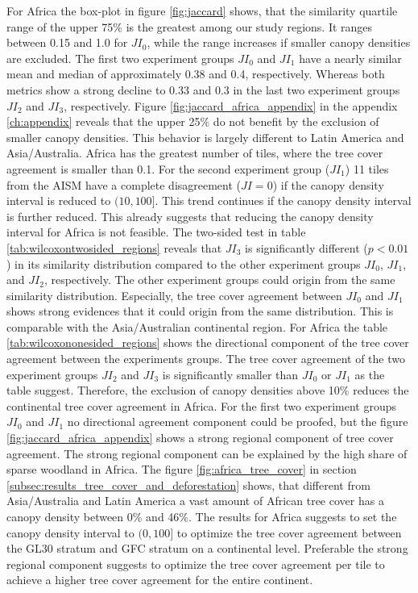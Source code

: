 			For Africa the box-plot in figure \ref{fig:jaccard} shows, that the similarity quartile range of the upper 75\% is the greatest among our study regions. It ranges between 0.15 and 1.0 for $JI_0$, while the range increases if smaller canopy densities are excluded. The first two experiment groups $JI_0$ and $JI_1$ have a nearly similar mean and median of approximately 0.38 and 0.4, respectively. Whereas both metrics show a strong decline to 0.33 and 0.3 in the last two experiment groups $JI_2$ and $JI_3$, respectively. Figure \ref{fig:jaccard_africa_appendix} in the appendix \ref{ch:appendix} reveals that the upper 25\% do not benefit by the exclusion of smaller canopy densities. This behavior is largely different to Latin America and Asia/Australia. Africa has the greatest number of tiles, where the tree cover agreement is smaller than 0.1. For the second experiment group ($JI_1$) 11 tiles from the \ac{AISM} have a complete disagreement ($JI=0$) if the canopy density interval is reduced to $(10,100]$. This trend continues if the canopy density interval is further reduced. This already suggests that reducing the canopy density interval for Africa is not feasible. The two-sided test in table \ref{tab:wilcoxontwosided_regions} reveals that $JI_3$ is significantly different ($p<0.01$) in its similarity distribution compared to the other experiment groups $JI_0$, $JI_1$, and $JI_2$, respectively. The other experiment groups could origin from the same similarity distribution. Especially, the tree cover agreement between $JI_0$ and $JI_1$ shows strong evidences that it could origin from the same distribution. This is comparable with the Asia/Australian continental region. For Africa the table \ref{tab:wilcoxononesided_regions} shows the directional component of the tree cover agreement between the experiments groups. The tree cover agreement of the two experiment groups $JI_2$ and $JI_3$ is significantly smaller than $JI_0$ or $JI_1$ as the table suggest. Therefore, the exclusion of canopy densities above 10\% reduces the continental tree cover agreement in Africa. For the first two experiment groups $JI_0$ and $JI_1$ no directional agreement component could be proofed, but the figure \ref{fig:jaccard_africa_appendix} shows a strong regional component of tree cover agreement. The strong regional component can be explained by the high share of sparse woodland in Africa. The figure \ref{fig:africa_tree_cover} in section \ref{subsec:results_tree_cover_and_deforestation} shows, that different from Asia/Australia and Latin America a vast amount of African tree cover has a canopy density between 0\% and 46\%. The results for Africa suggests to set the canopy density interval to $(0,100]$ to optimize the tree cover agreement between the \ac{GL30} stratum and \ac{GFC} stratum on a continental level. Preferable the strong regional component suggests to optimize the tree cover agreement per tile to achieve a higher tree cover agreement for the entire continent.

